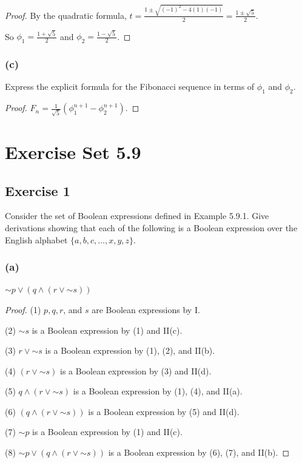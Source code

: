 \documentclass[14pt]{extarticle}
\newcommand{\dps}{\displaystyle}
\begin{document}
\begin{proof}
By the quadratic formula, \(\dps t = \frac{1 \pm \sqrt{(-1)^2 - 4(1)(-1)}}{2} = \frac{1 \pm \sqrt{5}}{2}\).

So \(\dps \phi_1 = \frac{1 + \sqrt{5}}{2}\) and \(\dps \phi_2 = \frac{1 - \sqrt{5}}{2}\).
\end{proof}

\subsubsection{(c)}
Express the explicit formula for the Fibonacci sequence in terms of $\phi_1$ and $\phi_2$.

\begin{proof}
\(\dps F_n = \frac{1}{\sqrt{5}}(\phi_1^{n+1} - \phi_2^{n+1})\).
\end{proof}

\section{Exercise Set 5.9}

\subsection{Exercise 1}
Consider the set of Boolean expressions defined in Example 5.9.1. Give derivations showing that each of the following 
is a Boolean expression over the English alphabet \(\{a, b, c, \ldots , x, y, z\}\).

\subsubsection{(a)}
\({\sim p} \vee (q \wedge (r \vee {\sim s}))\)

\begin{proof}
(1) $p, q, r$, and $s$ are Boolean expressions by I.

(2) \({\sim s}\) is a Boolean expression by (1) and II(c).

(3) \(r \vee {\sim s}\) is a Boolean expression by (1), (2), and II(b).

(4) \((r \vee {\sim s})\) is a Boolean expression by (3) and II(d).

(5) \(q \wedge (r \vee {\sim s})\) is a Boolean expression by (1), (4), and II(a).

(6) \((q \wedge (r \vee {\sim s}))\) is a Boolean expression by (5) and II(d).

(7) \({\sim p}\) is a Boolean expression by (1) and II(c).

(8) \({\sim p} \vee (q \wedge (r \vee {\sim s}))\) is a Boolean expression by (6), (7), and II(b).
\end{proof}
\end{document}
